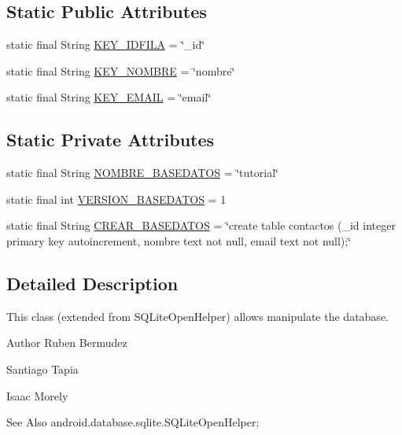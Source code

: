 \subsection*{Static Public Attributes}
\begin{DoxyCompactItemize}
\item 
static final String \hyperlink{classnpi_1_1practicaandroid_1_1tutorialnpi_1_1_database_helper_a01c9ea4ebd534861650c04100ebfb0e9}{K\-E\-Y\-\_\-\-I\-D\-F\-I\-L\-A} = \char`\"{}\-\_\-id\char`\"{}
\item 
static final String \hyperlink{classnpi_1_1practicaandroid_1_1tutorialnpi_1_1_database_helper_a4df448dc8b88288d8dcd5096e9c93de6}{K\-E\-Y\-\_\-\-N\-O\-M\-B\-R\-E} = \char`\"{}nombre\char`\"{}
\item 
static final String \hyperlink{classnpi_1_1practicaandroid_1_1tutorialnpi_1_1_database_helper_aa3bfbbc9ffcd236cc764895b0237b308}{K\-E\-Y\-\_\-\-E\-M\-A\-I\-L} = \char`\"{}email\char`\"{}
\end{DoxyCompactItemize}
\subsection*{Static Private Attributes}
\begin{DoxyCompactItemize}
\item 
static final String \hyperlink{classnpi_1_1practicaandroid_1_1tutorialnpi_1_1_database_helper_adae617106c904c3f532092172de81bb9}{N\-O\-M\-B\-R\-E\-\_\-\-B\-A\-S\-E\-D\-A\-T\-O\-S} = \char`\"{}tutorial\char`\"{}
\item 
static final int \hyperlink{classnpi_1_1practicaandroid_1_1tutorialnpi_1_1_database_helper_abb67bfd195cd7b3534a4d51e0dc5260f}{V\-E\-R\-S\-I\-O\-N\-\_\-\-B\-A\-S\-E\-D\-A\-T\-O\-S} = 1
\item 
static final String \hyperlink{classnpi_1_1practicaandroid_1_1tutorialnpi_1_1_database_helper_a943030e82324d9b39e297dee68ec917e}{C\-R\-E\-A\-R\-\_\-\-B\-A\-S\-E\-D\-A\-T\-O\-S} = \char`\"{}create table contactos (\-\_\-id integer primary key autoincrement, nombre text not null, email text not null);\char`\"{}
\end{DoxyCompactItemize}


\subsection{Detailed Description}
This class (extended from S\-Q\-Lite\-Open\-Helper) allows manipulate the database. 

\begin{DoxyAuthor}{Author}
Ruben Bermudez 

Santiago Tapia 

Isaac Morely
\end{DoxyAuthor}
\begin{DoxySeeAlso}{See Also}
android.\-database.\-sqlite.\-S\-Q\-Lite\-Open\-Helper; 
\end{DoxySeeAlso}


